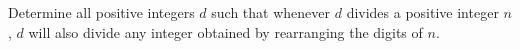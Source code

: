 Determine all positive integers $d$ such that whenever $d$ divides a positive integer $n$,  $d$ will also divide any integer obtained by rearranging the digits of $n$.